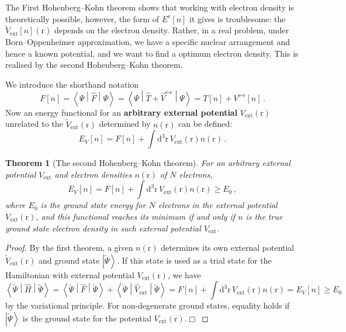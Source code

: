 \documentclass{article}
\theoremstyle{plain}\theoremheaderfont{\normalfont\itshape}\theorembodyfont{\rmfamily}\theoremseparator{.}\newtheorem*{rem}{Remark}\newtheorem*{ex}{Example}\newtheorem*{proof}{Proof}\newtheorem*{altp}{Alternative proof}
\theoremstyle{plain}\theoremheaderfont{\normalfont\bfseries}\theorembodyfont{\rmfamily}\theoremseparator{.}\newtheorem{thm}{Theorem}[section]\newtheorem{lem}[thm]{Lemma}\newtheorem{prop}[thm]{Proposition}\newtheorem*{cor}{Corollary}\newtheorem{defn}[thm]{Definition}\newtheorem{clm}[thm]{Claim}\newtheorem{clminproof}{Claim}\newtheorem{pos}{Postulate}[section]
\theoremstyle{break}\theoremheaderfont{\normalfont\itshape}\theorembodyfont{\rmfamily}\theoremseparator{.\medskip}\newtheorem*{proofskip}{Proof}\newtheorem*{exs}{Examples}\newtheorem*{rems}{Remarks}
\theoremstyle{break}\theoremheaderfont{\normalfont\bfseries}\theorembodyfont{\rmfamily}\theoremseparator{.\medskip}\newtheorem{lemskip}[thm]{Lemma}\newtheorem{defnskip}[thm]{Definition}\newtheorem{propskip}[thm]{Proposition}\newtheorem{thmskip}[thm]{Theorem}
\numberwithin{equation}{section}
\newcommand{\qed}{\hfill\ensuremath{\Box}}
\newcommand{\dd}[2][]{\mathrm{d}^{#1} #2\,}
\newcommand{\ket}[1]{\left| #1 \right\rangle}
\newcommand{\expval}[2]{\left\langle #2 \middle| #1 \middle| #2 \right\rangle}
\newcommand{\mel}[3]{\left\langle #1 \middle| #2 \middle| #3 \right\rangle}
\newcommand{\vb}[1]{\bm{\mathrm{#1}}}
\newcommand{\e}{^{\text{e}}}
\begin{document}
    The First Hohenberg--Kohn theorem shows that working with electron density is theoretically possible, however, the form of \(E\e[n]\) it gives is troublesome: the \(\tilde{V}_{\text{ext}}[n](\vb{r})\) depends on the electron density. Rather, in a real problem, under Born--Oppenheimer approximation, we have a specific nuclear arrangement and hence a known potential, and we want to find a optimum electron density. This is realised by the second Hohenberg--Kohn theorem.

    We introduce the shorthand notation
    \begin{equation}
        F[n]=\mel{\Psi}{\hat{F}}{\Psi}=\mel{\Psi}{\hat{T}+\hat{V}^{\text{e-e}}}{\Psi}=T[n]+V^{\text{e-e}}[n]\,.
    \end{equation}
    Now an energy functional for an \textbf{arbitrary external potential} \(V_{\text{ext}}(\vb{r})\) unrelated to the \(\tilde{V}_{\text{ext}}(\vb{r})\) determined by \(n(\vb{r})\) can be defined:
    \begin{equation}
        E_V[n]=F[n]+\int\dd[3]{\vb{r}}V_{\text{ext}}(\vb{r})n(\vb{r})\,.
    \end{equation}

    \begin{thm}[The second Hohenberg--Kohn theorem]
        For an arbitrary external potential \(V_{\text{ext}}\) and electron densities \(n(\vb{r})\) of \(N\) electrons,
        \begin{equation}\label{DFT_energy}
            E_V[n]=F[n]+\int\dd[3]{\vb{r}}V_{\text{ext}}(\vb{r})n(\vb{r})\ge E_0\,,
        \end{equation}
        where \(E_0\) is the ground state energy for \(N\) electrons in the external potential \(V_{\text{ext}}(\vb{r})\), and this functional reaches its minimum if and only if \(n\) is the true ground state electron density in such external potential \(V_{\text{ext}}\).
    \end{thm}
    \begin{proof}
        By the first theorem, a given \(n(\vb{r})\) determines its own external potential \(\tilde{V}_{\text{ext}}(\vb{r})\) and ground state \(\ket{\tilde{\Psi}}\). If this state is used as a trial state for the Hamiltonian with external potential \(V_{\text{ext}}(\vb{r})\), we have
        \begin{equation}
            \expval{\hat{H}}{\tilde{\Psi}}=\expval{\hat{F}}{\tilde{\Psi}}+\expval{\hat{V}_{\text{ext}}}{\tilde{\Psi}}=F[n]+\int\dd[3]{\vb{r}}V_{\text{ext}}(\vb{r})n(\vb{r})=E_V[n]\ge E_0
        \end{equation}
        by the variational principle. For non-degenerate ground states, equality holds if \(\ket{\tilde{\Psi}}\) is the ground state for the potential \(V_{\text{ext}}(\vb{r})\).\qed
    \end{proof}
\end{document}
